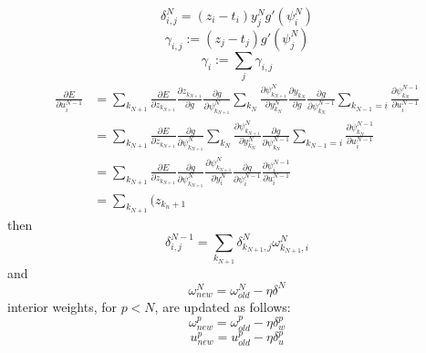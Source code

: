 \documentclass{article}
\begin{document}
%
\begin{equation} \label{eq:delta_full}
\delta_{i,j}^N = 
\left ( z_i - t_i \right ) y_j^N g' (\psi_i^N)
\end{equation}
%
\begin{equation} \label{eq:gamma}
\gamma_{i,j} := (z_j - t_j) g'(\psi_j^N)
\end{equation}
%
\begin{equation} \label{eq:gamma_array}
\gamma_i := \sum_j \gamma_{i,j}
\end{equation}
%
\begin{equation} \label{eq:derive_du_nm1}
\begin{aligned}
\frac{\partial E}{\partial u_i^{N-1}} &= 
\sum_{k_{N+1}} \frac{\partial E}{\partial z_{k_{N+1}}} \frac{\partial z_{k_{N+1}}}{\partial g} \frac{\partial g}{\partial \psi_{k_{N+1}}^N} \sum_{k_N} \frac{\partial \psi_{k_{N+1}}^N}{\partial y_{k_N}^N} \frac{\partial y_{k_{N}}}{\partial g} \frac{\partial g}{\partial \psi_{k_N}^{N-1}} \sum_{k_{N-1}=i} \frac{\partial \psi_{k_N}^{N-1}}{\partial u_i^{N-1}} \\
& = \sum_{k_{N+1}} \frac{\partial E}{\partial z_{k_{N+1}}} \frac{\partial g}{\partial \psi_{k_{N+1}}^N} \sum_{k_N} \frac{\partial \psi_{k_{N+1}}^N}{\partial y_{k_N}^N} \frac{\partial g}{\partial \psi_{k_N}^{N-1}} \sum_{k_{N-1}=i} \frac{\partial \psi_{k_N}^{N-1}}{\partial u_i^{N-1}} \\
& = \sum_{k_{N+1}} \frac{\partial E}{\partial z_{k_{N+1}}} \frac{\partial g}{\partial \psi_{k_{N+1}}^N} \frac{\partial \psi_{k_{N+1}}^N}{\partial y_i^N} \frac{\partial g}{\partial \psi_i^{N-1}} \frac{\partial \psi_i^{N-1}}{\partial u_i^{N-1}} \\
& = \sum_{k_{N+1}} (z_{k_n+1}
\end{aligned}
\end{equation}
%
then
%
\begin{equation} \label{eq:delta2}
\delta_{i,j}^{N-1} =
\sum_{k_{N+1}} \delta_{k_{N+1},j}^N \omega_{k_{N+1},i}^N
\end{equation}
%
and
%
\begin{equation} \label{eq:end_weights}
\omega_{new}^N = \omega_{old}^N - \eta \delta^N
\end{equation}
%
interior weights, for $p < N$, are updated as follows:
%
\begin{equation} \label{eq:w_weights}
\omega_{new}^p = \omega_{old}^p - \eta \delta_w^p
\end{equation}
%
\begin{equation} \label{eq:u_weights}
u_{new}^p = u_{old}^p - \eta \delta_u^p
\end{equation}
\end{document}
